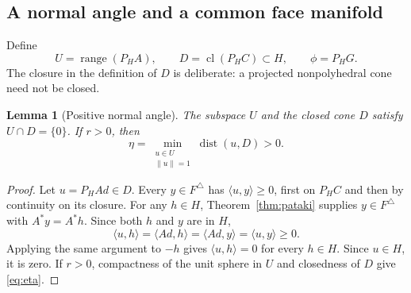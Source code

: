 \documentclass[11pt]{article}
\numberwithin{equation}{section}
\newtheorem{lemma}[theorem]{Lemma}
\theoremstyle{definition}
\theoremstyle{remark}
\DeclareMathOperator{\dist}{dist}
\DeclareMathOperator{\range}{range}
\DeclareMathOperator{\cl}{cl}
\newcommand{\ip}[2]{\langle #1,#2\rangle}
\newcommand{\norm}[1]{\lVert #1\rVert}
\newcommand{\dset}[2]{\dist(#1,#2)}
\begin{document}
\subsection{A normal angle and a common face manifold}

Define
\begin{equation}
 U=\range(P_HA),\qquad D=\cl(P_HC)\subset H,
 \qquad \phi=P_HG.
 \label{eq:normal}
\end{equation}
The closure in the definition of $D$ is deliberate: a projected
nonpolyhedral cone need not be closed.

\begin{lemma}[Positive normal angle]
\label{lem:angle}
The subspace $U$ and the closed cone $D$ satisfy $U\cap D=\{0\}$.
If $r>0$, then
\begin{equation}
 \eta=\min_{\substack{u\in U\\\norm{u}=1}}\dset{u}{D}>0.
 \label{eq:eta}
\end{equation}
\end{lemma}
\begin{proof}
Let $u=P_HAd\in D$. Every $y\in F^\triangle$ has
$\ip{u}{y}\geq0$, first on $P_HC$ and then by continuity on its closure.
For any $h\in H$, Theorem~\ref{thm:pataki} supplies
$y\in F^\triangle$ with $A^*y=A^*h$. Since both $h$ and $y$ are in $H$,
\[
 \ip{u}{h}=\ip{Ad}{h}=\ip{Ad}{y}=\ip{u}{y}\geq0.
\]
Applying the same argument to $-h$ gives $\ip{u}{h}=0$ for every
$h\in H$. Since $u\in H$, it is zero. If $r>0$, compactness of the unit
sphere in $U$ and closedness of $D$ give \eqref{eq:eta}.
\end{proof}
\end{document}
